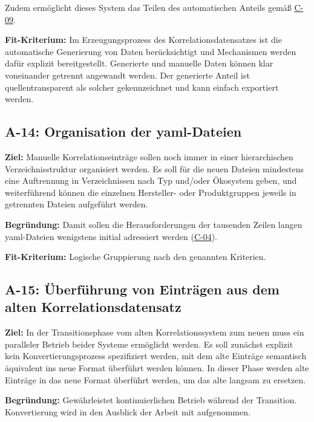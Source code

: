 Zudem ermöglicht dieses System das Teilen des automatischen Anteils gemäß \hyperref[subsec:c-09-sharing-of-public-data]{C-09}.

\textbf{Fit-Kriterium:}
Im Erzeugungsprozess des Korrelationsdatensatzes ist die automatische Generierung von Daten berücksichtigt und Mechanismen werden dafür explizit bereitgestellt.
Generierte und manuelle Daten können klar voneinander getrennt angewandt werden.
Der generierte Anteil ist quellentransparent als solcher gekennzeichnet und kann einfach exportiert werden.

\subsection{A-14: Organisation der \acrshort{yaml}-Dateien}\label{subsec:req-yaml-file-organization}

\textbf{Ziel:}
Manuelle Korrelationseinträge sollen noch immer in einer hierarchischen Verzeichnisstruktur organisiert werden.
Es soll für die neuen Dateien mindestens eine Auftrennung in Verzeichnissen nach Typ und/oder Ökosystem geben, und weiterführend können die einzelnen Hersteller- oder Produktgruppen jeweils in getrennten Dateien aufgeführt werden.

\textbf{Begründung:}
Damit sollen die Herausforderungen der tausenden Zeilen langen \acrshort{yaml}-Dateien wenigstens initial adressiert werden (\hyperref[subsec:c-04-groe-und-unubersichtliche-yaml-dateien]{C-04}).

\textbf{Fit-Kriterium:}
Logische Gruppierung nach den genannten Kriterien.

\subsection{A-15: Überführung von Einträgen aus dem alten Korrelationsdatensatz}\label{subsec:req-current-dataset-conversion}

\textbf{Ziel:}
In der Transitionsphase vom alten Korrelationssystem zum neuen muss ein paralleler Betrieb beider Systeme ermöglicht werden.
Es soll zunächst explizit kein Konvertierungsprozess spezifiziert werden, mit dem alte Einträge semantisch äquivalent ins neue Format überführt werden können.
In dieser Phase werden alte Einträge in das neue Format überführt werden, um das alte langsam zu ersetzen.

\textbf{Begründung:}
Gewährleistet kontinuierlichen Betrieb während der Transition.
Konvertierung wird in den Ausblick der Arbeit mit aufgenommen.


